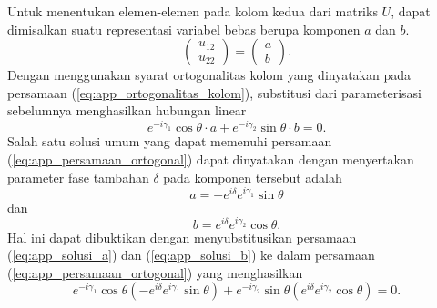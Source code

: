 Untuk menentukan elemen-elemen pada kolom kedua dari matriks $U$, dapat dimisalkan suatu representasi variabel bebas berupa komponen $a$ dan $b$.
\begin{equation}
\label{eq:app_param_kolom2}
\begin{pmatrix} u_{12} \\ u_{22} \end{pmatrix} = \begin{pmatrix} a \\ b \end{pmatrix}.
\end{equation}
Dengan menggunakan syarat ortogonalitas kolom yang dinyatakan pada persamaan (\ref{eq:app_ortogonalitas_kolom}), substitusi dari parameterisasi sebelumnya menghasilkan hubungan linear
\begin{equation}
\label{eq:app_persamaan_ortogonal}
e^{-i\gamma_1} \cos\theta \cdot a + e^{-i\gamma_2} \sin\theta \cdot b = 0.
\end{equation}
Salah satu solusi umum yang dapat memenuhi persamaan (\ref{eq:app_persamaan_ortogonal}) dapat dinyatakan dengan menyertakan parameter fase tambahan $\delta$ pada komponen tersebut adalah
\begin{equation}
\label{eq:app_solusi_a}
a = -e^{i\delta} e^{i\gamma_1} \sin\theta
\end{equation}
dan
\begin{equation}
\label{eq:app_solusi_b}
b = e^{i\delta} e^{i\gamma_2} \cos\theta.
\end{equation}
Hal ini dapat dibuktikan dengan menyubstitusikan persamaan (\ref{eq:app_solusi_a}) dan (\ref{eq:app_solusi_b}) ke dalam persamaan (\ref{eq:app_persamaan_ortogonal}) yang menghasilkan
\begin{equation}
e^{-i\gamma_1} \cos\theta \left( -e^{i\delta} e^{i\gamma_1} \sin\theta \right) + e^{-i\gamma_2} \sin\theta \left( e^{i\delta} e^{i\gamma_2} \cos\theta \right) = 0.
\end{equation}


